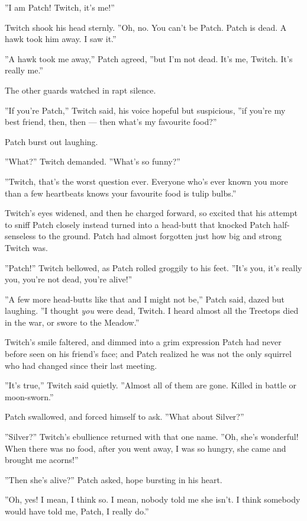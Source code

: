 \documentclass[12pt]{book}
\begin{document}
''I am Patch! Twitch, it's me!''

Twitch shook his head sternly. ''Oh, no. You can't be Patch. Patch is dead. A hawk took him away. I saw it.''

''A hawk took me away,'' Patch agreed, ''but I'm not dead. It's me, Twitch. It's really me.''

The other guards watched in rapt silence.

''If you're Patch,'' Twitch said, his voice hopeful but suspicious, ''if you're my best friend, then, then ---
then what's my favourite food?''

Patch burst out laughing.

''What?'' Twitch demanded. ''What's so funny?''

''Twitch, that's the worst question ever. Everyone who's ever known you more than a few heartbeats knows your favourite food is tulip bulbs.''

Twitch's eyes widened, and then he charged forward, so excited that his attempt to sniff Patch closely instead turned into a head-butt that knocked Patch half-senseless to the ground. Patch had almost forgotten just how big and strong Twitch was.

''Patch!'' Twitch bellowed, as Patch rolled groggily to his feet. ''It's you, it's really you, you're not dead, you're alive!''

''A few more head-butts like that and I might not be,'' Patch said, dazed but laughing. ''I thought {\it you} were dead, Twitch. I heard almost all the Treetops died in the war, or swore to the Meadow.''

Twitch's smile faltered, and dimmed into a grim expression Patch had never before seen on his friend's face; and Patch realized he was not the only squirrel who had changed since their last meeting.

''It's true,'' Twitch said quietly. ''Almost all of them are gone. Killed in battle or moon-sworn.''

Patch swallowed, and forced himself to ask. ''What about Silver?''

''Silver?'' Twitch's ebullience returned with that one name. ''Oh, she's wonderful! When there was no food, after you went away, I was so hungry, she came and brought me acorns!''

''Then she's alive?'' Patch asked, hope bursting in his heart.

''Oh, yes! I mean, I think so. I mean, nobody told me she isn't. I think somebody would have told me, Patch, I really do.''
\end{document}
